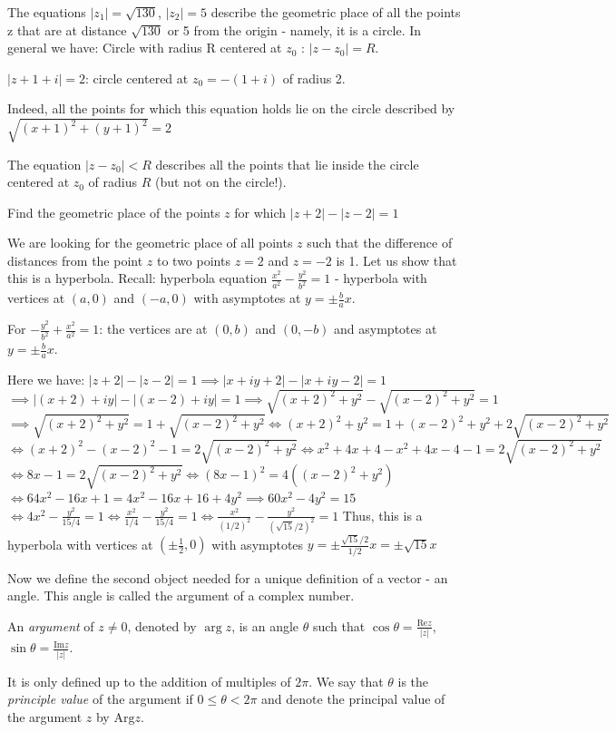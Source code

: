 \documentclass[12pt]{article}
\newcommand{\Rea}{\text{Re}}
\newcommand{\Ima}{\text{Im}}
\begin{document}
The equations $|z_1|=\sqrt{130}$, $|z_2|=5$ describe the geometric place of all the points z that are at distance $\sqrt{130}$ or 5 from the origin - namely, it is a circle. In general we have:
Circle with radius R centered at $z_0$ : $|z-z_0| = R$.
\begin{example}
$|z+1+i| = 2$: circle centered at $z_0 = -(1+i)$ of radius 2.

Indeed, all the points for which this equation holds lie on the circle described by $\sqrt{(x+1)^2+(y+1)^2} = 2$
\end{example}

The equation $|z-z_0|<R$ describes all the points that lie inside the circle centered at $z_0$ of radius $R$ (but not on the circle!).

\begin{example}
 Find the geometric place of the points $z$ for which $|z+2|-|z-2| = 1$
\end{example}
We are looking for the geometric place of all points $z$ such that the difference of distances from the point $z$ to two points $z=2$ and $z=-2$ is 1. Let us show that this is a hyperbola.
Recall: hyperbola equation $\frac{x^2}{a^2} - \frac{y^2}{b^2} = 1$ - hyperbola with vertices at $(a,0)$ and $(-a,0)$ with asymptotes at $y=\pm \frac{b}{a}x$.

For $-\frac{y^2}{b^2}+\frac{x^2}{a^2} = 1$: the vertices are at $(0,b)$ and $(0,-b)$ and asymptotes at $y=\pm \frac{b}{a}x$.

Here we have:
$ |z+2|-|z-2| = 1 \implies |x+iy+2| - |x+iy-2| = 1 $
$ \implies |(x+2)+iy|-|(x-2)+iy| = 1 \implies \sqrt{(x+2)^2+y^2} - \sqrt{(x-2)^2+y^2} = 1 $
$ \implies \sqrt{(x+2)^2+y^2} = 1 + \sqrt{(x-2)^2+y^2} \iff (x+2)^2+y^2 = 1 + (x-2)^2+y^2 + 2\sqrt{(x-2)^2+y^2} $
$ \iff (x+2)^2 - (x-2)^2 -1 = 2\sqrt{(x-2)^2+y^2} \iff x^2+4x+4-x^2+4x-4-1 = 2\sqrt{(x-2)^2+y^2} $
$ \iff 8x-1 = 2\sqrt{(x-2)^2+y^2} \iff (8x-1)^2 = 4((x-2)^2+y^2) $
$ \iff 64x^2-16x+1 = 4x^2-16x+16+4y^2 \implies 60x^2-4y^2 = 15$
$ \iff 4x^2 - \frac{y^2}{15/4} = 1 \iff \frac{x^2}{1/4} - \frac{y^2}{15/4} = 1 \iff \frac{x^2}{(1/2)^2} - \frac{y^2}{(\sqrt{15}/2)^2} = 1 $
Thus, this is a hyperbola with vertices at $(\pm \frac{1}{2}, 0)$ with asymptotes $y= \pm\frac{\sqrt{15}/2}{1/2}x = \pm \sqrt{15}x$

Now we define the second object needed for a unique definition of a vector - an angle. This angle is called the argument of a complex number.

\begin{definition}
An \emph{argument} of $z \neq 0$, denoted by $\arg z$, is an angle $\theta$ such that $\cos\theta = \frac{\Rea z}{|z|}$, $\sin \theta = \frac{\Ima z}{|z|}$.
\end{definition}
 It is only defined up to the addition of multiples of $2\pi$. We say that $\theta$ is the \emph{principle value} of the argument if $0\leq \theta < 2\pi$ and denote the principal value of the argument $z$ by $\text{Arg} z$.
\end{document}
